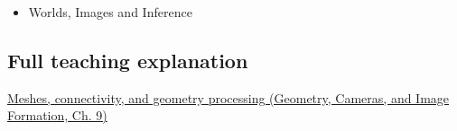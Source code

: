 \begin{itemize}
\tightlist
\item
  {Worlds, Images and Inference}
\end{itemize}

\subsection{Full teaching explanation}\label{appendix-1dd4ad54ca57-full-teaching-explanation}

\href{../03-Geometry-Cameras-and-Image-Formation/main.pdf\#nameddest=03-visual-computing-i-ch002-meshes-connectivity-and-geometry-processing}{Meshes, connectivity, and geometry processing (Geometry, Cameras, and Image Formation, Ch. 9)}
